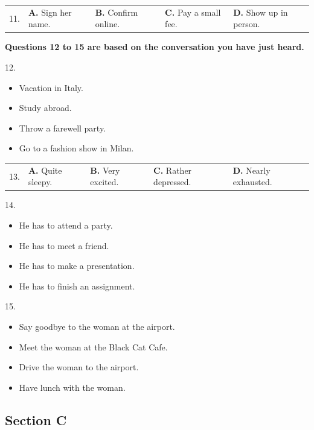 \documentclass[UTF8,11pt]{ctexart}
\begin{document}
\noindent\begin{tabularx}{\linewidth}{@{}lXXXX@{}}11. & \textbf{A.} Sign her name. & \textbf{B.} Confirm online. & \textbf{C.} Pay a small fee. & \textbf{D.} Show up in person.\\\end{tabularx}\par

\textbf{Questions 12 to 15 are based on the conversation you have just heard.}


12.


\begin{itemize}[leftmargin=2em,itemsep=.2em,topsep=.4em]\item[A.] Vacation in Italy.
\item[B.] Study abroad.
\item[C.] Throw a farewell party.
\item[D.] Go to a fashion show in Milan.
\end{itemize}

\noindent\begin{tabularx}{\linewidth}{@{}lXXXX@{}}13. & \textbf{A.} Quite sleepy. & \textbf{B.} Very excited. & \textbf{C.} Rather depressed. & \textbf{D.} Nearly exhausted.\\\end{tabularx}\par

14.


\begin{itemize}[leftmargin=2em,itemsep=.2em,topsep=.4em]\item[A.] He has to attend a party.
\item[B.] He has to meet a friend.
\item[C.] He has to make a presentation.
\item[D.] He has to finish an assignment.
\end{itemize}

15.


\begin{itemize}[leftmargin=2em,itemsep=.2em,topsep=.4em]\item[A.] Say goodbye to the woman at the airport.
\item[B.] Meet the woman at the Black Cat Cafe.
\item[C.] Drive the woman to the airport.
\item[D.] Have lunch with the woman.
\end{itemize}

\subsection*{\textbf{Section C}}
\end{document}
